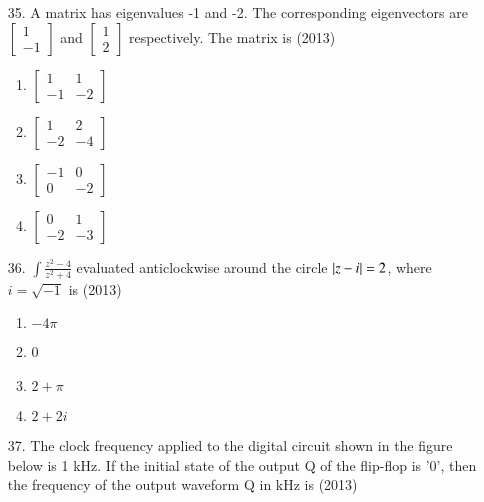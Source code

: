 \documentclass[journal]{IEEEtran}
\begin{document}
\begin{enumerate}
    \item[35.] A matrix has eigenvalues -1 and -2. The corresponding eigenvectors are $\begin{bmatrix}1\\-1\end{bmatrix}$ and $\begin{bmatrix}1\\2\end{bmatrix}$ respectively. The matrix is \hfill (2013)
    \begin{enumerate}[label=(\Alph*)]
        \item $\begin{bmatrix}1&1\\-1&-2\end{bmatrix}$
        \item $\begin{bmatrix}1&2\\-2&-4\end{bmatrix}$
        \item $\begin{bmatrix}-1&0\\0&-2\end{bmatrix}$
        \item $\begin{bmatrix}0&1\\-2&-3\end{bmatrix}$
    \end{enumerate}
    \item[36.] $\int\frac{z^2-4}{z^2+4}$  evaluated anticlockwise around the circle $\left\vert z-i\right\vert=2$, where $i=\sqrt{-1}$ is \hfill (2013)
     \begin{enumerate}[label=(\Alph*)]
        \item $-4\pi$
        \item 0
        \item $2+\pi$
        \item $2+2i$
     \end{enumerate}
    \item[37.] The clock frequency applied to the digital circuit shown in the figure below is 1 kHz. If the initial
    state of the output Q of the flip-flop is '0', then the frequency of the output waveform Q in kHz is \hfill (2013)
    \begin{figure}[!ht]
        \centering
\end{figure}
\end{enumerate}
\end{document}
